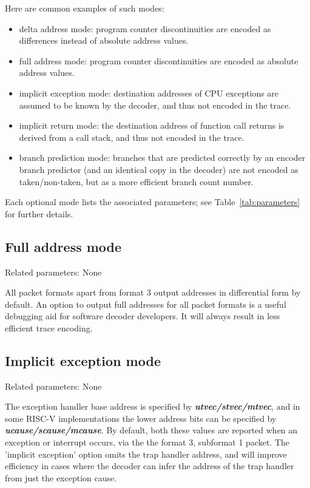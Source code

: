 Here are common examples of such modes:

\begin{itemize}
  \item delta address mode:
    program counter discontinuities are encoded as differences instead of absolute address values.
  \item full address mode:
    program counter discontinuities are encoded as absolute address values.
  \item implicit exception mode:
    destination addresses of CPU exceptions are assumed to be known by the decoder, and thus not encoded
    in the trace.
  \item implicit return mode:
    the destination address of function call returns is derived from a call stack, and thus not encoded
    in the trace.
  \item branch prediction mode:
    branches that are predicted correctly by an encoder branch predictor (and an identical copy in the decoder)
    are not encoded as taken/non-taken, but as a more efficient branch count number.
\end{itemize}

Each optional mode lists the associated parameters; see Table~\ref{tab:parameters} for further 
details.

\subsection{Full address mode} \label{sec:full-address}

Related parameters: None

All packet formats apart from format 3 output addresses in differential form by default.
An option to output full addresses for all packet formats is a useful debugging aid for 
software decoder developers.  It will always result in less efficient trace encoding.

\subsection{Implicit exception mode} \label{sec:implicit-exception}

Related parameters: None

The exception handler base address is specified by \textbf{\textit{utvec/stvec/mtvec}}, and 
in some RISC-V implementations the lower address bits can be specified by 
\textbf{\textit{ucause/scause/mcause}}.  
By default, both these values are reported when an exception or interrupt occurs, 
via the the format 3, subformat 1 packet.  The 'implicit exception' option omits the 
trap handler address, and will improve efficiency in cases where the decoder can infer 
the address of the trap handler from just the exception cause.

